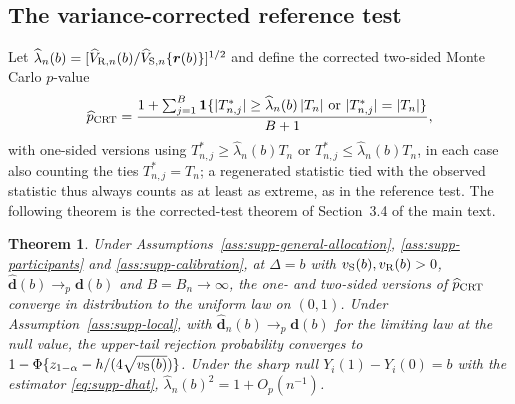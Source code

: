 \documentclass[12pt,a4paper]{article}
\newtheorem{theorem}{Theorem}
\theoremstyle{definition}
\theoremstyle{remark}\newtheorem{remark}{Remark}
\numberwithin{equation}{section}
\begin{document}
\subsection{The variance-corrected reference test}\label{sec:supp-crt}
Let $\widehat\lambda_n(b)=[\widehat V_{{\rm R},n}(b)/\widehat V_{{\rm S},n}\{\bm r(b)\}]^{1/2}$ and define the corrected two-sided Monte Carlo $p$-value
\begin{equation}\label{eq:supp-crt-p}
 \widehat p_{\rm CRT}=\frac{1+\sum_{j=1}^B
 \mathbf 1\{|T^*_{n,j}|\ge\widehat\lambda_n(b)\,|T_n|\ \text{or}\ |T^*_{n,j}|=|T_n|\}}{B+1},
\end{equation}
with one-sided versions using $T^*_{n,j}\ge\widehat\lambda_n(b)T_n$ or $T^*_{n,j}\le\widehat\lambda_n(b)T_n$, in each case also counting the ties $T^*_{n,j}=T_n$; a regenerated statistic tied with the observed statistic thus always counts as at least as extreme, as in the reference test. The following theorem is the corrected-test theorem of Section~3.4 of the main text.

\begin{theorem}\label{thm:supp-crt}
Under Assumptions~\ref{ass:supp-general-allocation}, \ref{ass:supp-participants} and \ref{ass:supp-calibration}, at $\Delta=b$ with $v_{\rm S}(b),v_{\rm R}(b)>0$, $\widehat{\bm d}(b)\to_p\bm d(b)$ and $B=B_n\to\infty$, the one- and two-sided versions of $\widehat p_{\rm CRT}$ converge in distribution to the uniform law on $(0,1)$. Under Assumption~\ref{ass:supp-local}, with $\widehat{\bm d}_n(b)\to_p\bm d(b)$ for the limiting law at the null value, the upper-tail rejection probability converges to $1-\Phi\{z_{1-\alpha}-h/(4\sqrt{v_{\rm S}(b)})\}$. Under the sharp null $Y_i(1)-Y_i(0)=b$ with the estimator \eqref{eq:supp-dhat}, $\widehat\lambda_n(b)^2=1+O_p(n^{-1})$.
\end{theorem}
\end{document}
